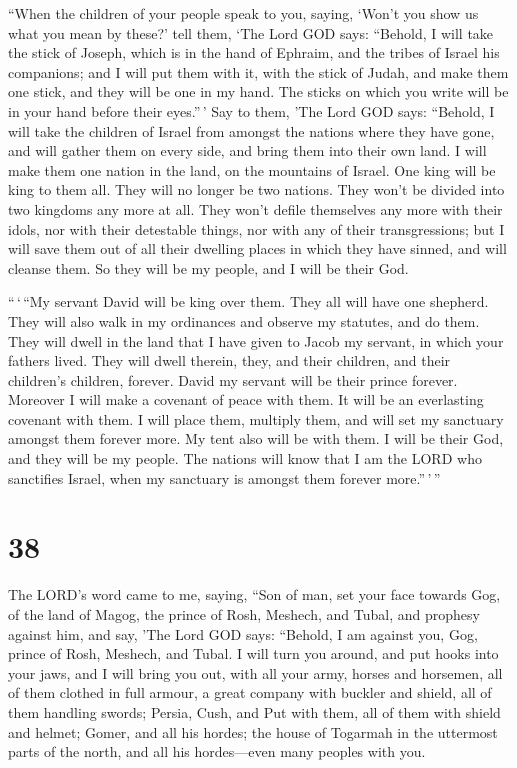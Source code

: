  ``When the children of your people speak to you, saying,
`Won't you show us what you mean by these?'  tell them,
`The Lord GOD says: ``Behold, I will take the stick of Joseph, which is
in the hand of Ephraim, and the tribes of Israel his companions; and I
will put them with it, with the stick of Judah, and make them one stick,
and they will be one in my hand.  The sticks on which you
write will be in your hand before their eyes.''\,'  Say
to them, 'The Lord GOD says: ``Behold, I will take the children of
Israel from amongst the nations where they have gone, and will gather
them on every side, and bring them into their own land. 
I will make them one nation in the land, on the mountains of Israel. One
king will be king to them all. They will no longer be two nations. They
won't be divided into two kingdoms any more at all.  They
won't defile themselves any more with their idols, nor with their
detestable things, nor with any of their transgressions; but I will save
them out of all their dwelling places in which they have sinned, and
will cleanse them. So they will be my people, and I will be their God.

 ``\,`\,``My servant David will be king over them. They
all will have one shepherd. They will also walk in my ordinances and
observe my statutes, and do them.  They will dwell in the
land that I have given to Jacob my servant, in which your fathers lived.
They will dwell therein, they, and their children, and their children's
children, forever. David my servant will be their prince forever.
 Moreover I will make a covenant of peace with them. It
will be an everlasting covenant with them. I will place them, multiply
them, and will set my sanctuary amongst them forever more.
 My tent also will be with them. I will be their God, and
they will be my people.  The nations will know that I am
the LORD who sanctifies Israel, when my sanctuary is amongst them
forever more.''\,'\,''

\hypertarget{section-36}{%
\section{38}\label{section-36}}

 The LORD's word came to me, saying,  ``Son
of man, set your face towards Gog, of the land of Magog, the prince of
Rosh, Meshech, and Tubal, and prophesy against him,  and
say, 'The Lord GOD says: ``Behold, I am against you, Gog, prince of
Rosh, Meshech, and Tubal.  I will turn you around, and put
hooks into your jaws, and I will bring you out, with all your army,
horses and horsemen, all of them clothed in full armour, a great company
with buckler and shield, all of them handling swords; 
Persia, Cush, and Put with them, all of them with shield and helmet;
 Gomer, and all his hordes; the house of Togarmah in the
uttermost parts of the north, and all his hordes---even many peoples
with you.

